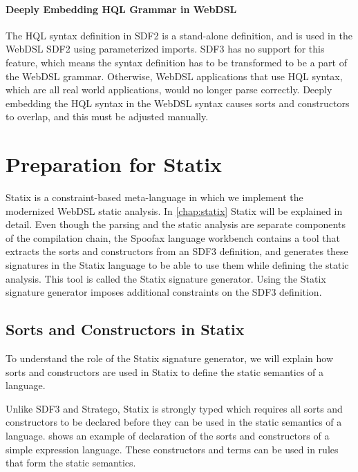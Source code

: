       \paragraph{Deeply Embedding HQL Grammar in WebDSL} The HQL syntax definition in SDF2 is a stand-alone definition, and is used in the WebDSL SDF2 using parameterized imports. SDF3 has no support for this feature, which means the syntax definition has to be transformed to be a part of the WebDSL grammar. Otherwise, WebDSL applications that use HQL syntax, which are all real world applications, would no longer parse correctly. Deeply embedding the HQL syntax in the WebDSL syntax causes sorts and constructors to overlap, and this must be adjusted manually.

  \section{\label{sec:preparation-for-statix}Preparation for Statix}

    Statix is a constraint-based meta-language in which we implement the modernized WebDSL static analysis. In \cref{chap:statix} Statix will be explained in detail. Even though the parsing and the static analysis are separate components of the compilation chain, the Spoofax language workbench contains a tool that extracts the sorts and constructors from an SDF3 definition, and generates these signatures in the Statix language to be able to use them while defining the static analysis. This tool is called the Statix signature generator. Using the Statix signature generator imposes additional constraints on the SDF3 definition.

    \subsection{\label{subsec:sorts-in-statix}Sorts and Constructors in Statix}

      To understand the role of the Statix signature generator, we will explain how sorts and constructors are used in Statix to define the static semantics of a language.

      Unlike SDF3 and Stratego, Statix is strongly typed which requires all sorts and constructors to be declared before they can be used in the static semantics of a language.  shows an example of declaration of the sorts and constructors of a simple expression language. These constructors and terms can be used in rules that form the static semantics.

